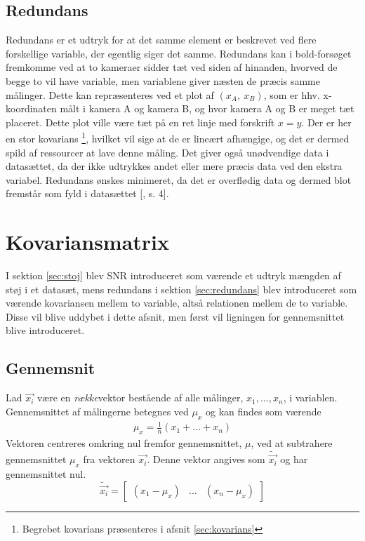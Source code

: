 \subsection{Redundans} \label{sec:redundans}
Redundans er et udtryk for at det samme element er beskrevet ved flere forskellige variable, der egentlig siger det samme. Redundans kan i bold-forsøget fremkomme ved at to kameraer sidder tæt ved siden af hinanden, hvorved de begge to vil have variable, men variablene giver næsten de præcis samme målinger. Dette kan repræsenteres ved et plot af $(x_{A},\ x_{B})$, som er hhv. x-koordinaten målt i kamera A og kamera B, og hvor kamera A og B er meget tæt placeret. Dette plot ville være tæt på en ret linje med forskrift $x=y$. Der er her en stor kovarians \footnote{Begrebet kovarians præsenteres i afsnit \vref{sec:kovarians}}, hvilket vil sige at de er lineært afhængige, og det er dermed spild af ressourcer at lave denne måling. Det giver også unødvendige data i datasættet, da der ikke udtrykkes andet eller mere præcis data ved den ekstra variabel. Redundans ønskes minimeret, da det er overflødig data og dermed blot fremstår som fyld i datasættet [\citet{PCA_slens}, s. 4]. 

\section{Kovariansmatrix}\label{sec:kovarians}
I sektion \vref{sec:stoj} blev SNR introduceret som værende et udtryk mængden af støj i et datasæt, mens redundans i sektion \vref{sec:redundans} blev introduceret som værende kovariansen mellem to variable, altså relationen mellem de to variable. Disse vil blive uddybet i dette afsnit, men først vil ligningen for gennemsnittet blive introduceret.

\subsection{Gennemsnit}
Lad $\vec{x_i}$ være en \emph{række}vektor bestående af alle målinger, $x_1,\ldots,x_n$, i variablen. Gennemsnittet af målingerne betegnes ved $\mu_{x}$ og kan findes som værende\\
\begin{align}
\mu_{x} = \frac{1}{n}(x_1+ ... + x_n)
\label{eq:average}
\end{align}
Vektoren centreres omkring nul fremfor gennemsnittet, $\mu$, ved at subtrahere gennemsnittet $\mu_{x}$ fra vektoren $\vec{x_i}$. Denne vektor angives som $\tilde{\vec{x_i}}$ og har gennemsnittet nul.
\begin{equation}
\tilde{\vec{x_i}} = \begin{bmatrix}
(x_1 - \mu_{x}) & \hdots & (x_n - \mu_{x})
\end{bmatrix}
\end{equation}

